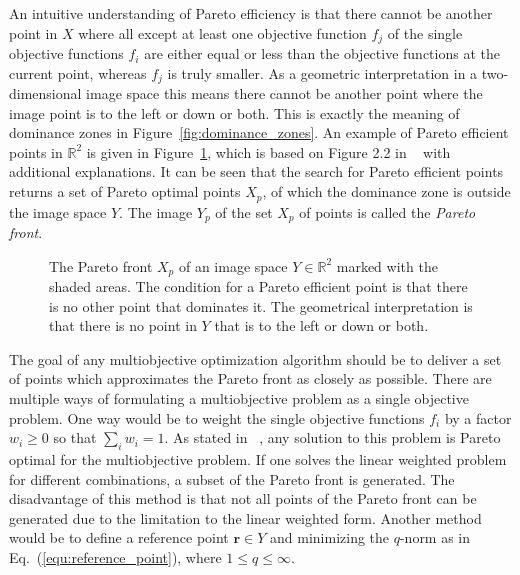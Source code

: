 \documentclass[a4paper,10pt]{article}
\renewcommand{\vec}[1]{\mathbf{#1}}
\newcommand{\equref}[1]{Eq.~(\ref{#1})}
\newcommand{\figref}[1]{Figure~\ref{#1}}
\begin{document}
    An intuitive understanding of Pareto efficiency is that there cannot be another
    point in $X$ where all except at least one objective function $f_j$ of the single objective
    functions $f_i$ are either equal or less than the objective functions at the current point,
    whereas $f_j$ is truly smaller.
    As a geometric interpretation in a two-dimensional image space this means
    there cannot be another point where the image point is to the left or down or both.
    This is exactly the meaning of dominance zones in \figref{fig:dominance_zones}.
    An example of Pareto efficient points in $\mathbb{R}^2$ is given in \figref{fig:pareto_front},
    which is based on Figure 2.2 in ~\cite{multiobjective} with additional explanations.
    It can be seen that the search for Pareto efficient points returns a
    set of Pareto optimal points $X_p$, of which the dominance zone is outside the
    image space $Y$.
    The image $Y_p$ of the set $X_p$ of points is called the \emph{Pareto front}.
    
    \begin{figure}
        \centering
        \caption[Pareto front]{The Pareto front $X_p$ of an image space $Y \in \mathbb{R}^2$
        marked with the shaded areas.
        The condition for a Pareto efficient point is that there is no other
        point that dominates it.
        The geometrical interpretation is that there is no point in $Y$ that
        is to the left or down or both.}
        \label{fig:pareto_front}
    \end{figure}
    
    The goal of any multiobjective optimization algorithm should be to deliver
    a set of points which approximates the Pareto front as closely as possible.
    There are multiple ways of formulating a multiobjective problem as
    a single objective problem.
    One way would be to weight the single objective functions $f_i$ by a factor
    $w_i \geq 0$ so that $\sum_i w_i = 1$.
    As stated in ~\cite{multiobjective}, any solution to this problem is Pareto
    optimal for the multiobjective problem.
    If one solves the linear weighted problem for different combinations,
    a subset of the Pareto front is generated.
    The disadvantage of this method is that not all points of the Pareto front
    can be generated due to the limitation to the linear weighted form.
    Another method would be to define a reference point $\vec{r} \in Y$ and
    minimizing the $q$-norm as in \equref{equ:reference_point}, where
    $1 \leq q \leq \infty$.
\end{document}
